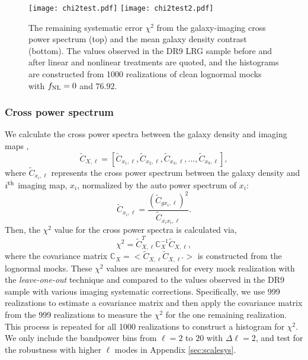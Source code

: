 \begin{figure}
\raggedleft
\texttt{[image: chi2test.pdf]}
\texttt{[image: chi2test2.pdf]}
\caption{The remaining systematic error $\chi^{2}$ from the galaxy-imaging cross power spectrum (top) and the mean galaxy density contrast (bottom). The values observed in the DR9 LRG sample before and after linear and nonlinear treatments are quoted, and the histograms are constructed from 1000 realizations of clean lognormal mocks with $f_{\rm NL}=0$ and $76.92$. }\label{fig:chi2test}
\end{figure}


\subsubsection{Cross power spectrum}

We calculate the cross power spectra between the galaxy density and imaging  maps ,
\begin{equation}
\tilde{C}_{X, \ell} = [\tilde{C}_{x_{1}, \ell}, \tilde{C}_{x_{2}, \ell}, \tilde{C}_{x_{3}, \ell}, ..., \tilde{C}_{x_{9}, \ell}],
\end{equation}
where $\tilde{C}_{x_{i}, \ell}$ represents the cross power spectrum between the galaxy density and $i^{\rm th}$ imaging map, $x_{i}$, normalized by the auto power spectrum of $x_{i}$:
\begin{equation}
\tilde{C}_{x_{i}, \ell} = \frac{(\tilde{C}_{gx_{i}, \ell})^{2}}{\tilde{C}_{x_{i}x_{i},\ell}}.
\end{equation}
Then, the $\chi^{2}$ value for the cross power spectra is calculated via,
\begin{equation}
\chi^{2} = \tilde{C}^{T}_{X, \ell} \mathbb{C}_{X}^{-1} \tilde{C}_{X, \ell},
\end{equation}
where the covariance matrix $\mathbb{C}_{X} = < \tilde{C}_{X, \ell} \tilde{C}_{X, \ell'} >$ is constructed from the lognormal mocks. These $\chi^{2}$ values are measured for every mock realization with the \textit{leave-one-out} technique and compared to the values observed in the DR9 sample with various imaging systematic corrections. Specifically, we use 999 realizations to estimate a covariance matrix and then apply the covariance matrix from the 999 realizations to measure the $\chi^{2}$ for the one remaining realization. This process is repeated for all 1000 realizations to construct a histogram for $\chi^{2}$.  We only include the bandpower bins from $\ell=2$ to $20$ with $\Delta\ell=2$, and test for the robustness with higher $\ell$ modes in Appendix \ref{sec:scalesys}. 

